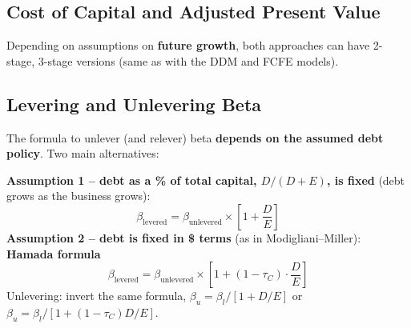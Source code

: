 \subsection[Cost of Capital and Adjusted Present Value]{Cost of Capital and Adjusted Present Value }

\begin{center}
\end{center}
Depending on assumptions on \textbf{future growth}, both approaches can have 2-stage, 3-stage versions (same as with the DDM and FCFE models).

\subsection[Levering and Unlevering Beta]{Levering and Unlevering Beta }

The formula to unlever (and relever) beta \textbf{depends on the assumed debt policy}. Two main alternatives:
\begin{keybox}
\textbf{Assumption 1 -- debt as a \% of total capital, $D/(D+E)$, is fixed} (debt grows as the business grows):
\[
\beta_{\text{levered}} = \beta_{\text{unlevered}}\times\left[1+\frac{D}{E}\right]
\]
\textbf{Assumption 2 -- debt is fixed in \$ terms} (as in Modigliani--Miller): \textbf{Hamada formula}
\[
\beta_{\text{levered}} = \beta_{\text{unlevered}}\times\left[1+(1-\tau_C)\cdot\frac{D}{E}\right]
\]
Unlevering: invert the same formula, $\beta_u=\beta_l/[1+D/E]$ or $\beta_u=\beta_l/[1+(1-\tau_C)D/E]$.
\end{keybox}

